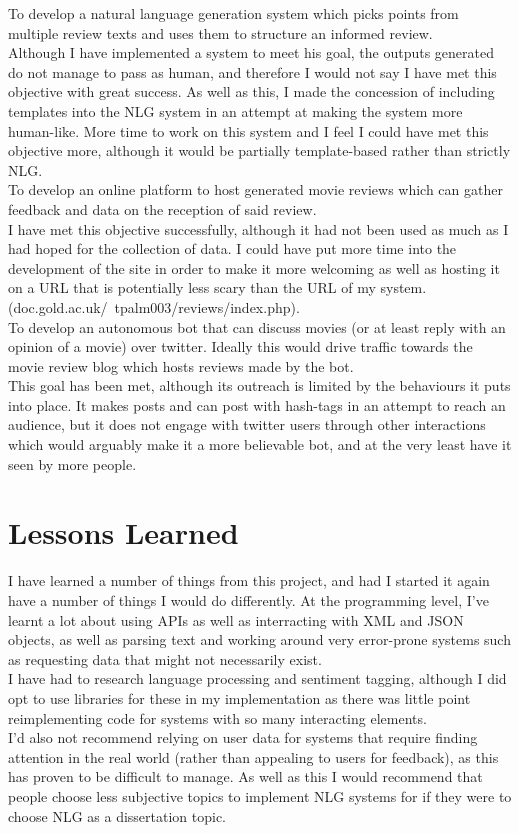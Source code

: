 To develop a natural language generation system which picks points from multiple review texts and uses them to structure an informed review.\\
Although I have implemented a system to meet his goal, the outputs generated do not manage to pass as human, and therefore I would not say I have met this objective with great success. As well as this, I made the concession of including templates into the NLG system in an attempt at making the system more human-like. More time to work on this system and I feel I could have met this objective more, although it would be partially template-based rather than strictly NLG.\\
To develop an online platform to host generated movie reviews which can gather feedback and data on the reception of said review.\\
I have met this objective successfully, although it had not been used as much as I had hoped for the collection of data. I could have put more time into the development of the site in order to make it more welcoming as well as hosting it on a URL that is potentially less scary than the URL of my system. (doc.gold.ac.uk/~tpalm003/reviews/index.php).\\
To develop an autonomous bot that can discuss movies (or at least reply with an opinion of a movie) over twitter. Ideally this would drive traffic towards the movie review blog which hosts reviews made by the bot.\\
This goal has been met, although its outreach is limited by the behaviours it puts into place. It makes posts and can post with hash-tags in an attempt to reach an audience, but it does not engage with twitter users through other interactions which would arguably make it a more believable bot, and at the very least have it seen by more people.\\


\section{Lessons Learned}
I have learned a number of things from this project, and had I started it again have a number of things I would do differently.
At the programming level, I've learnt a lot about using APIs as well as interracting with XML and JSON objects, as well as parsing text and working around very error-prone systems such as requesting data that might not necessarily exist.\\
I have had to research language processing and sentiment tagging, although I did opt to use libraries for these in my implementation as there was little point reimplementing code for systems with so many interacting elements.\\
I'd also not recommend relying on user data for systems that require finding attention in the real world (rather than appealing to users for feedback), as this has proven to be difficult to manage. As well as this I would recommend that people choose less subjective topics to implement NLG systems for if they were to choose NLG as a dissertation topic.


